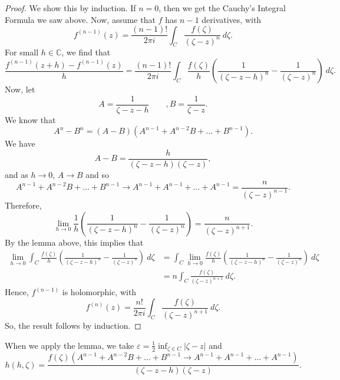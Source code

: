 \documentclass[a4paper, openany]{memoir}
\theoremstyle{definition}
\theoremstyle{plain}
\begin{document}
    \begin{proof}
        We show this by induction. If $n = 0$, then we get the Cauchy's Integral Formula we saw above. Now, assume that $f$ has $n-1$ derivatives, with
        \[f^{(n-1)}(z) = \frac{(n-1)!}{2\pi i} \int_C \frac{f(\zeta)}{(\zeta - z)^n} \ d\zeta.\]
        For small $h \in \mathbb{C}$, we find that
        \[\frac{f^{(n-1)}(z+h) - f^{(n-1)}(z)}{h} = \frac{(n-1)!}{2\pi i} \int_C \frac{f(\zeta)}{h} \left(\frac{1}{(\zeta - z - h)^n} - \frac{1}{(\zeta - z)^n}\right) \ d\zeta.\]
        Now, let
        \[A = \frac{1}{\zeta - z - h}\qquad, B = \frac{1}{\zeta - z}.\]
        We know that
        \[A^n - B^n = (A - B)(A^{n-1} + A^{n-2}B + \dots + B^{n-1}).\]
        We have
        \[A - B = \frac{h}{(\zeta - z - h)(\zeta - z)},\]
        and as $h \to 0$, $A \to B$ and so 
        \[A^{n-1} + A^{n-2}B + \dots + B^{n-1} \to A^{n-1} + A^{n-1} + \dots + A^{n-1} = \frac{n}{(\zeta - z)^{n-1}}.\]
        Therefore,
        \[\lim_{h \to 0} \frac{1}{h} \left(\frac{1}{(\zeta - z - h)^n} - \frac{1}{(\zeta - z)^n}\right) = \frac{n}{(\zeta - z)^{n+1}}.\]
        By the lemma above, this implies that
        \begin{align*}
            \lim_{h \to 0} \int_C \frac{f(\zeta)}{h} \left(\frac{1}{(\zeta - z - h)^n} - \frac{1}{(\zeta - z)^n}\right) \ d\zeta &= \int_C \lim_{h \to 0} \frac{f(\zeta)}{h} \left(\frac{1}{(\zeta - z - h)^n} - \frac{1}{(\zeta - z)^n}\right) \ d\zeta \\
            &= n \int_C \frac{f(\zeta)}{(\zeta - z)^{n+1}} \ d\zeta.
        \end{align*}
        Hence, $f^{(n-1)}$ is holomorphic, with
        \[f^{(n)}(z) = \frac{n!}{2\pi i} \int_C \frac{f(\zeta)}{(\zeta - z)^{n+1}} \ d\zeta.\]
        So, the result follows by induction.
    \end{proof}
    When we apply the lemma, we take $\varepsilon = \frac{1}{2} \inf_{\zeta \in C} |\zeta - z|$ and 
    \[h(h, \zeta) = \frac{f(\zeta) (A^{n-1} + A^{n-2}B + \dots + B^{n-1} \to A^{n-1} + A^{n-1} + \dots + A^{n-1})}{(\zeta - z - h)(\zeta - z)}.\]
\end{document}
